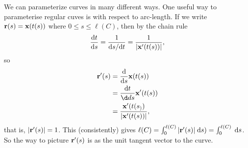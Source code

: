 \documentclass[a4paper]{scrreprt}
\begin{document}
We can parameterize curves in many different ways. One useful way to parameterise regular cuves is with respect to arc-length.
If we write $\mathbf{r}(s) = \mathbf{x}(t(s))$ where $0 \leq s \leq \ell(C)$, then by the chain rule
$$
	\frac{\mathrm{d} t}{\mathrm{d} s} = \frac{1}{\mathrm{d} s/ \mathrm{d} t} = \frac{1}{|\mathbf{x}'(t(s))|},
$$
so
\begin{align*}
	\vv{r}'(s) &= \frac{\dd}{\dd s} \vv{x}(t(s)) \\
	&= \frac{\dd t}{\d d s} \vv{x}'(t(s)) \\
	&= \frac{\vv{x}'(t(s_))}{|\vv{x}'(t(s))|},
\end{align*}
that is, $|\mathbf{r}'(s)| = 1$. This (consistently) gives $\ell(C) = \int_0^{\ell(C)} |\mathbf{r}'(s)| \; \mathrm{d} s) = \int_0^{\ell(C)} \; \mathrm{d} s$.
So the way to picture $\mathbf{r}'(s)$ is as the unit tangent vector to the curve.
\end{document}
